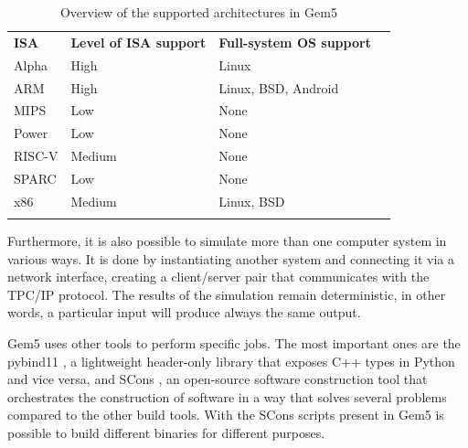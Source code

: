 \begin{table}[H]
\centering
\begin{tabular}{llll}
\cline{1-3}
\multicolumn{1}{|l|}{\cellcolor[HTML]{9B9B9B}\textbf{ISA}} & \multicolumn{1}{l|}{\cellcolor[HTML]{9B9B9B}\textbf{Level of ISA support}} & \multicolumn{1}{l|}{\cellcolor[HTML]{9B9B9B}\textbf{Full-system OS support}} &  \\ \cline{1-3}
\multicolumn{1}{|l|}{Alpha} & \multicolumn{1}{l|}{High} & \multicolumn{1}{l|}{Linux} &  \\ \cline{1-3}
\multicolumn{1}{|l|}{ARM} & \multicolumn{1}{l|}{High} & \multicolumn{1}{l|}{Linux, BSD, Android} &  \\ \cline{1-3}
\multicolumn{1}{|l|}{MIPS} & \multicolumn{1}{l|}{Low} & \multicolumn{1}{l|}{None} &  \\ \cline{1-3}
\multicolumn{1}{|l|}{Power} & \multicolumn{1}{l|}{Low} & \multicolumn{1}{l|}{None} &  \\ \cline{1-3}
\multicolumn{1}{|l|}{RISC-V} & \multicolumn{1}{l|}{Medium} & \multicolumn{1}{l|}{None} &  \\ \cline{1-3}
\multicolumn{1}{|l|}{SPARC} & \multicolumn{1}{l|}{Low} & \multicolumn{1}{l|}{None} &  \\ \cline{1-3}
\multicolumn{1}{|l|}{x86} & \multicolumn{1}{l|}{Medium} & \multicolumn{1}{l|}{Linux, BSD} &  \\ \cline{1-3}
 &  &  & 
\end{tabular}
\caption{Overview of the supported architectures in Gem5 \cite{hempelsimulation}}
\label{tab_ISAsupport}
\end{table}

Furthermore, it is also possible to simulate more than one computer system in various ways. It is done by instantiating another system and 
connecting it via a network interface, creating a client/server pair that communicates with the TPC/IP protocol. The results of the simulation 
remain deterministic, in other words, a particular input will produce always the same output. 

Gem5 uses other tools to perform specific jobs. The most important ones are the pybind11 \cite{jakob2019pybind11}, a lightweight header-only 
library that exposes C++ types in Python and vice versa, and SCons \cite{knight2002scons}, an open-source software construction tool that 
orchestrates the construction of software in a way that solves several problems compared to the other build tools. With the SCons scripts 
present in Gem5 is possible to build different binaries for different purposes. 

